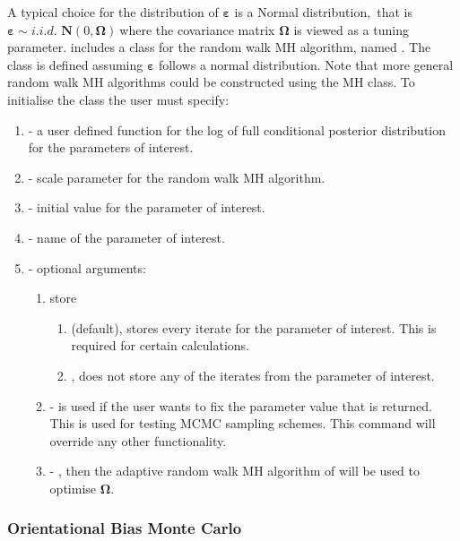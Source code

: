 \documentclass[article]{jss}
\begin{document}
A typical choice for the distribution of $\bm{\bm{\varepsilon}}$ is a
Normal distribution,\emph{\ }that is $\bm{\varepsilon\sim}i.i.d.$
$\bm{N}\left(0,\bm{\Omega}\right)\ $where the covariance matrix
$\bm{\Omega}$ is viewed as a tuning parameter.  includes a
class for the random walk MH algorithm, named . The class
 is defined assuming $\bm{\varepsilon}$ follows a normal
distribution. Note that more general random walk MH algorithms could
be constructed using the MH class. To initialise the class the user
must specify:
\begin{enumerate}
\item {} - a user defined function for the log of full conditional
  posterior distribution for the parameters of interest.
\item {} - scale parameter for the random walk MH algorithm.
\item {} - initial value for the parameter of interest.
\item {} - name of the parameter of interest.
\item {} - optional arguments:

  \begin{enumerate}
  \item store 
    \begin{enumerate}
      \item {} (default), stores every iterate for the
        parameter of interest. This is required for certain calculations.
      \item {}, does not store any of the iterates from the parameter of
        interest.
      \end{enumerate}
\item {} - is used if the user wants to fix the
  parameter value that is returned. This is used for testing MCMC
  sampling schemes.  This command will override any other
  functionality.
\item {} - , then the adaptive random walk MH
  algorithm of \citet{GarthwaiteYanScisson2010} will be used to
  optimise $\bm{\Omega}.$
\end{enumerate}
\end{enumerate}

\subsubsection{Orientational Bias Monte Carlo}
\end{document}
